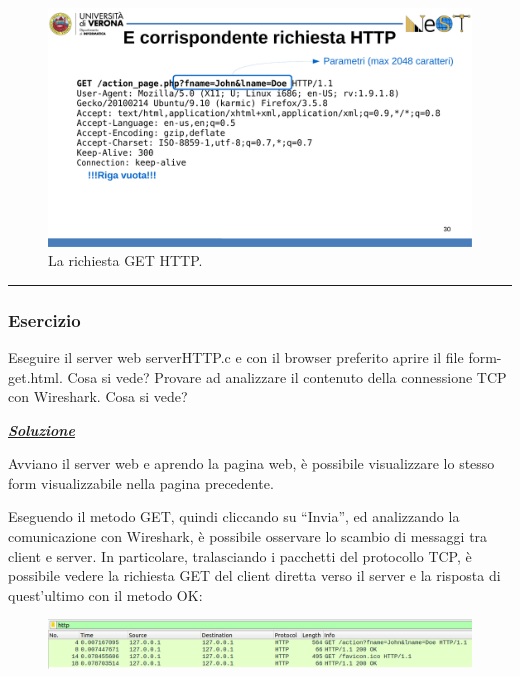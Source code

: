 \documentclass[a4paper]{article}
\newcommand{\longline}{\noindent\rule{\textwidth}{0.4pt}}
\newcommand{\dquotes}[1]{``#1''}
\begin{document}
	\begin{figure}[!htp]
		\centering
		\includegraphics[width=\textwidth]{img/richiesta_get.pdf}
		\caption{La richiesta GET HTTP.}
	\end{figure}
	
	\longline
	
	\subsubsection[\textcolor{Red3}{\textbf{Esercizio}}]{Esercizio}
	
	Eseguire il server web \textsf{serverHTTP.c} e con il browser preferito aprire il file \textsf{form-get.html}. Cosa si vede? Provare ad analizzare il contenuto della connessione TCP con Wireshark. Cosa si vede?\newline
	
	\noindent
	\textcolor{Green4}{\underline{\textbf{\emph{Soluzione}}}}\newline
	
	\noindent
	Avviano il server web e aprendo la pagina web, è possibile visualizzare lo stesso form visualizzabile nella pagina precedente.\newline
	
	\noindent
	Eseguendo il metodo GET, quindi cliccando su \dquotes{Invia}, ed analizzando la comunicazione con Wireshark, è possibile osservare lo scambio di messaggi tra client e server. In particolare, tralasciando i pacchetti del protocollo TCP, è possibile vedere la richiesta GET del client diretta verso il server e la risposta di quest'ultimo con il metodo OK:
	\begin{figure}[!htp]
		\centering
		\includegraphics[width=\textwidth]{img/web-server/web-server-2.png}
	\end{figure}
	
\end{document}

